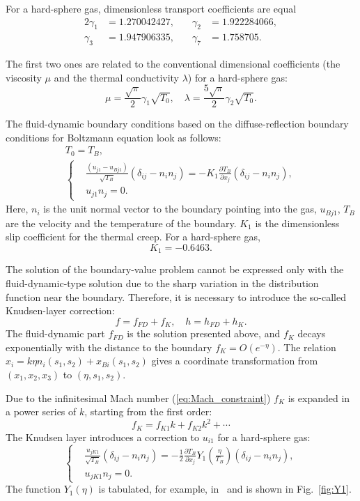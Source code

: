 \documentclass[smallextended, referee]{svjour3} %
\newcommand{\pder}[2][]{\frac{\partial#1}{\partial#2}}
\begin{document}
For a hard-sphere gas, dimensionless transport coefficients are equal
\begin{alignat*}{2}
	\gamma_1 &= 1.270042427, &\quad \gamma_2 &= 1.922284066, \\
	\gamma_3 &= 1.947906335, &\quad \gamma_7 &= 1.758705.
\end{alignat*}

The first two ones are related to the conventional dimensional coefficients
(the viscosity \(\mu\) and the thermal conductivity \(\lambda\)) for a hard-sphere gas:
\[ \mu = \frac{\sqrt\pi}2\gamma_1\sqrt{T_0}, \quad \lambda = \frac{5\sqrt\pi}2\gamma_2\sqrt{T_0}. \]

The fluid-dynamic boundary conditions based on the diffuse-reflection boundary conditions
for Boltzmann equation look as follows:
\begin{gather}
	T_0 = T_B, \label{eq:bound:T} \\
	\left\{
	\begin{aligned}
		& \frac{(u_{j1}-u_{Bj1})}{\sqrt{T_B}}(\delta_{ij}-n_in_j) = 
			-K_1\pder[T_B]{x_j}(\delta_{ij}-n_in_j), \\
		& u_{j1}n_j = 0.
	\end{aligned}
	\right. \label{eq:bound:v}
\end{gather}
Here, \(n_i\) is the unit normal vector to the boundary pointing into the gas,
\(u_{Bj1}\), \(T_B\) are the velocity and the temperature of the boundary.
\(K_1\) is the dimensionless slip coefficient for the thermal creep. For a hard-sphere gas,
\[ K_1 = -0.6463. \]

The solution of the boundary-value problem cannot be expressed only with the fluid-dynamic-type
solution due to the sharp variation in the distribution function near the boundary.
Therefore, it is necessary to introduce the so-called Knudsen-layer correction:
\begin{equation}
	f = f_{FD} + f_K, \quad h = h_{FD} + h_K.
\end{equation}
The fluid-dynamic part \(f_{FD}\) is the solution presented above,
and \(f_K\) decays exponentially with the distance to the boundary \(f_K = O\left(e^{-\eta}\right)\).
The relation \( x_i = k\eta n_i(s_1,s_2) + x_{Bi}(s_1, s_2) \) gives a coordinate transformation
from \((x_1,x_2,x_3)\) to \((\eta,s_1,s_2)\).

Due to the infinitesimal Mach number (\ref{eq:Mach_constraint}) \(f_K\) is expanded
in a power series of \(k\), starting from the first order:
\[ f_K = f_{K1} k + f_{K2} k ^ 2 + \cdots \]
The Knudsen layer introduces a correction to \(u_{i1}\) for a hard-sphere gas:
\begin{equation}
	\left\{
	\begin{aligned}
		& \frac{u_{jK1}}{\sqrt{T_B}}(\delta_{ij}-n_in_j) =
			-\frac12\pder[T_B]{x_j} Y_1\left(\frac\eta{T_B}\right) (\delta_{ij}-n_in_j), \\
		& u_{jK1}n_j = 0.
	\end{aligned}
	\right. \label{eq:bound:v_K}
\end{equation}
The function \(Y_1(\eta)\) is tabulated, for example, in~\cite{Sone2002, Sone2007} and is shown in Fig.~\ref{fig:Y1}.
\end{document}
